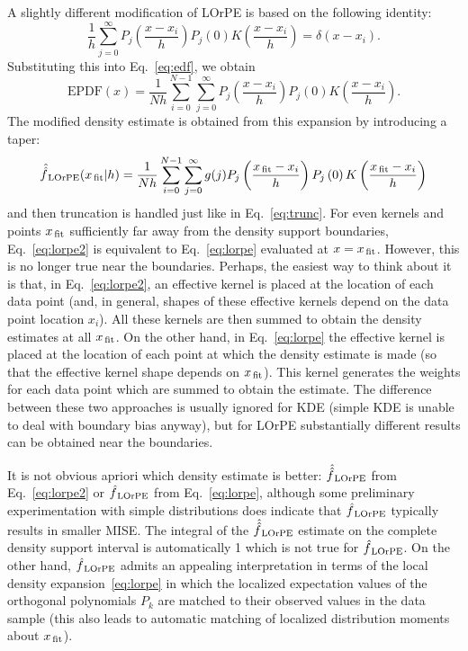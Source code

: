 \documentclass[12pt,titlepage]{article}
\newcommand{\sub}[1]{\ensuremath{_{\mbox{\scriptsize \,#1}}}}
\begin{document}
A slightly different modification of LOrPE is based on the following
identity:
\begin{equation}\label{eq:deltasum}
\frac{1}{h} \sum_{j=0}^{\infty} P_{j}\left(\frac{x - x_i}{h}\right)P_{j}\left(0\right) K\left(\frac{x - x_i}{h}\right) = \delta(x - x_i).
\end{equation}
Substituting this into Eq.~\ref{eq:edf}, we obtain
\begin{equation}
\mbox{EPDF}(x) = \frac{1}{N h} \sum_{i=0}^{N-1} \sum_{j=0}^{\infty} P_{j}\left(\frac{x - x_i}{h}\right)P_{j}\left(0\right) K\left(\frac{x - x_i}{h}\right).
\end{equation}
The modified density estimate is obtained from this expansion by introducing a taper:
\begin{equation}
\hat{\hat{f}}\sub{LOrPE}(x\sub{fit}|h) = \frac{1}{N h} \sum_{i=0}^{N-1} \sum_{j=0}^{\infty} g(j) P_{j}\left(\frac{x\sub{fit} - x_i}{h}\right)P_{j}\left(0\right) K\left(\frac{x\sub{fit} - x_i}{h}\right)
\label{eq:lorpe2}
\end{equation}
and then truncation is handled just like in Eq.~\ref{eq:trunc}.
For even kernels and points $x\sub{fit}$ sufficiently far away from the density support
boundaries, Eq.~\ref{eq:lorpe2} is equivalent to Eq.~\ref{eq:lorpe}
evaluated at $x = x\sub{fit}$. However, this is no longer true near the boundaries.
Perhaps, the easiest way to think about it is that, in Eq.~\ref{eq:lorpe2},
an effective kernel is placed at the location of each data point
(and, in general, shapes of these effective kernels
depend on the data point location $x_i$).
All these kernels are then summed to obtain the density estimates
at all $x\sub{fit}$.
On the other hand, in Eq.~\ref{eq:lorpe} the effective kernel is placed
at the location of each point at which the density estimate is made (so
that the effective kernel shape depends on $x\sub{fit}$).
This kernel generates the weights for each data point which are summed to
obtain the estimate. The difference between these two approaches
is usually ignored for KDE
(simple KDE is unable to deal with boundary bias anyway),
but for LOrPE substantially different results can be obtained near
the boundaries.

It is not obvious apriori which density estimate is better:
$\hat{\hat{f}}\sub{LOrPE}$ from Eq.~\ref{eq:lorpe2}
or $\hat{f}\sub{LOrPE}$ from  Eq.~\ref{eq:lorpe},
although some preliminary experimentation with simple distributions
does indicate that
$\hat{f}\sub{LOrPE}$ typically results in smaller MISE.
The integral of the $\hat{\hat{f}}\sub{LOrPE}$ estimate
on the complete density support interval is automatically 1
which is not true for $\hat{f}\sub{LOrPE}$. On the other
hand, $\hat{f}\sub{LOrPE}$ admits an appealing interpretation
in terms of the local density expansion~\ref{eq:lorpe} in which
the localized expectation values of the orthogonal polynomials
$P_k$ are matched to their observed values
in the data sample (this also leads to automatic matching
of localized distribution moments about $x\sub{fit}$).
\end{document}
